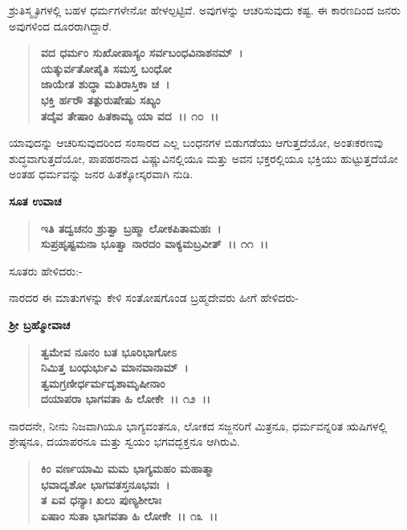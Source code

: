 ಶ್ರುತಿಸ್ಮೃತಿಗಳಲ್ಲಿ ಬಹಳ ಧರ್ಮಗಳೇನೋ ಹೇಳಲ್ಪಟ್ಟಿವೆ. ಅವುಗಳನ್ನು ಆಚರಿಸುವುದು ಕಷ್ಟ. ಈ ಕಾರಣದಿಂದ ಜನರು ಅವುಗಳಿಂದ ದೂರರಾಗಿದ್ದಾರೆ.

\begin{verse}
\textbf{ವದ ಧರ್ಮಂ ಸುಖೋಪಾಸ್ಯಂ ಸರ್ವಬಂಧವಿನಾಶನಮ್~।}\\\textbf{ಯತ್ಕುರ್ವತೋಪೈತಿ ಸಮಸ್ತ ಬಂಧೋ }\\\textbf{ಜಾಯೇತ ಶುದ್ಧಾ ಮತಿರಾಸ್ತಿಕಾ ಚ~।}\\\textbf{ಭಕ್ತಿ ರ್ಹರೌ ತತ್ಪುರುಷೇಷು ಸಖ್ಯಂ }\\\textbf{ತದೈವ ತೇಷಾಂ ಹಿತಕಾಮ್ಯ ಯಾ ವದ~।। ೧೦~।।}
\end{verse}

ಯಾವುದನ್ನು ಆಚರಿಸುವುದರಿಂದ ಸಂಸಾರದ ಎಲ್ಲ ಬಂಧನಗಳ ಬಿಡುಗಡೆಯು ಆಗುತ್ತದೆಯೋ, ಅಂತಃಕರಣವು ಶುದ್ಧವಾಗುತ್ತದೆಯೋ, ಪಾಪಹರನಾದ ವಿಷ್ಣುವಿನಲ್ಲಿಯೂ ಮತ್ತು ಅವನ ಭಕ್ತರಲ್ಲಿಯೂ ಭಕ್ತಿಯು ಹುಟ್ಟುತ್ತದೆಯೋ ಅಂತಹ ಧರ್ಮವನ್ನು ಜನರ ಹಿತಕ್ಕೋಸ್ಕರವಾಗಿ ನುಡಿ.

\begin{flushleft}
\textbf{ಸೂತ ಉವಾಚ\enginline{-}}
\end{flushleft}

\begin{verse}
\textbf{ಇತಿ ತದ್ವಚನಂ ಶ್ರುತ್ವಾ ಬ್ರಹ್ಮಾ ಲೋಕಪಿತಾಮಹಃ~।}\\\textbf{ಸುಪ್ರಹೃಷ್ಟಮನಾ ಭೂತ್ವಾ ನಾರದಂ ವಾಕ್ಯಮಬ್ರವೀತ್~।। ೧೧~।।}
\end{verse}

\noindent
ಸೂತರು ಹೇಳಿದರು:-

ನಾರದರ ಈ ಮಾತುಗಳನ್ನು ಕೇಳಿ ಸಂತೋಷಗೊಂಡ ಬ್ರಹ್ಮದೇವರು ಹೀಗೆ ಹೇಳಿದರು-

\begin{flushleft}
\textbf{ಶ‍್ರೀ ಬ್ರಹ್ಮೋವಾಚ\enginline{-}}
\end{flushleft}

\begin{verse}
\textbf{ತ್ವಮೇವ ನೂನಂ ಬತ ಭೂರಿಭಾಗೋಽ}\\\textbf{ನಿಮಿತ್ತ ಬಂಧುರ್ಭುವಿ ಮಾನವಾನಾಮ್~।}\\\textbf{ತ್ವಮಗ್ರಣೀರ್ಧರ್ಮದೃಶಾಮೃಷೀನಾಂ } \\\textbf{ದಯಾಪರಾ ಭಾಗವತಾ ಹಿ ಲೋಕೇ~।। ೧೨~।।}
\end{verse}

ನಾರದನೇ, ನೀನು ನಿಜವಾಗಿಯೂ ಭಾಗ್ಯವಂತನೂ, ಲೋಕದ ಸಜ್ಜನರಿಗೆ ಮಿತ್ರನೂ, ಧರ್ಮವನ್ನರಿತ ಋಷಿಗಳಲ್ಲಿ ಶ್ರೇಷ್ಠನೂ, ದಯಾಪರನೂ ಮತ್ತು ಸ್ವಯಂ ಭಗವದ್ಭಕ್ತನೂ ಆಗಿರುವಿ.

\begin{verse}
\textbf{ಕಿಂ ವರ್ಣಯಾಮಿ ಮಮ ಭಾಗ್ಯಮಹಂ ಮಹಾತ್ಮಾ}\\\textbf{ಭವಾದೃಶೋ ಭಾಗವತಸ್ತನೂಭವಃ~।}\\\textbf{ತ ಏವ ಧನ್ಯಾಃ ಖಲು ಪುಣ್ಯಶೀಲಾಃ}\\\textbf{ಏಷಾಂ ಸುತಾ ಭಾಗವತಾ ಹಿ ಲೋಕೇ~।। ೧೩~।।}
\end{verse}

